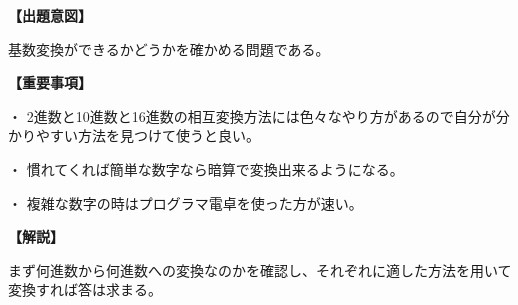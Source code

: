 \noindent \textbf{【出題意図】}

\noindent 基数変換ができるかどうかを確かめる問題である。

\vspace{1em}
\noindent \textbf{【重要事項】}

\medskip
\noindent ・ 2進数と10進数と16進数の相互変換方法には色々なやり方があるので自分が分かりやすい方法を見つけて使うと良い。

\medskip
\noindent ・ 慣れてくれば簡単な数字なら暗算で変換出来るようになる。

\medskip
\noindent ・ 複雑な数字の時はプログラマ電卓を使った方が速い。

\vspace{1em}
\noindent \textbf{【解説】}

\noindent まず何進数から何進数への変換なのかを確認し、それぞれに適した方法を用いて変換すれば答は求まる。
